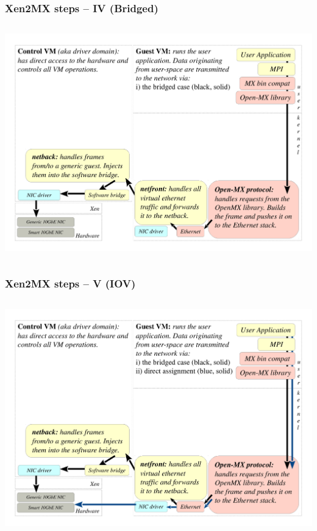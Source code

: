 \documentclass[red,slidestop,notes,compress,mathserif]{beamer}
\begin{document}
\begin{frame}
\frametitle{Xen2MX steps -- IV (Bridged)}
\begin{columns}
\includegraphics[width=\textwidth]{figs/bare/xen2mx_step4.pdf}
\end{columns}
\end{frame}

\begin{frame}
\frametitle{Xen2MX steps -- V (IOV)}
\begin{columns}
\includegraphics[width=\textwidth]{figs/bare/xen2mx_step5.pdf}
\end{columns}
\end{frame}
\end{document}
